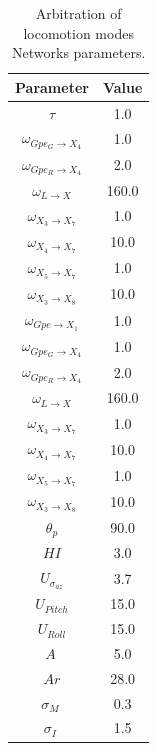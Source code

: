 \documentclass[preprint,12pt]{elsarticle}
\begin{document}
\begin{table}[t]
\centering
\caption{Arbitration of locomotion modes Networks parameters.}
\begin{tabular}{|c|c|}
\hline
\textbf{Parameter} & \textbf{Value} \\ \hline
$\tau$ & 1.0 \\ \hline

$\omega_{Gpe_G \rightarrow X_4}$ & 1.0 \\ \hline
$\omega_{Gpe_R \rightarrow X_4}$ & 2.0 \\ \hline

$\omega_{L \rightarrow X}$ & 160.0 \\ \hline

$\omega_{X_3 \rightarrow X_7}$ & 1.0 \\ \hline
$\omega_{X_4 \rightarrow X_7}$ & 10.0 \\ \hline
$\omega_{X_5 \rightarrow X_7}$ & 1.0 \\ \hline

$\omega_{X_3 \rightarrow X_8}$ & 10.0 \\ \hline
$\omega_{Gpe \rightarrow X_1}$ & 1.0 \\ \hline

$\omega_{Gpe_G \rightarrow X_4}$ & 1.0 \\ \hline
$\omega_{Gpe_R \rightarrow X_4}$ & 2.0 \\ \hline

$\omega_{L \rightarrow X}$ & 160.0 \\ \hline



$\omega_{X_3 \rightarrow X_7}$ & 1.0 \\ \hline
$\omega_{X_4 \rightarrow X_7}$ & 10.0 \\ \hline
$\omega_{X_5 \rightarrow X_7}$ & 1.0 \\ \hline

$\omega_{X_3 \rightarrow X_8}$ & 10.0 \\ \hline

$\theta_{p}$ & 90.0 \\ \hline

$HI$ & 3.0 \\ \hline

$U_{\sigma_{az}}$ & 3.7 \\ \hline
$U_{Pitch}$ & 15.0 \\ \hline
$U_{Roll}$ & 15.0 \\ \hline
$A\ $ & 5.0 \\ \hline
$ Ar $ & 28.0 \\ \hline
$\sigma_{M}\ $ & 0.3 \\ \hline
$\sigma_{I}\ $ & 1.5 \\ \hline
\end{tabular}
\label{table:Locom_NN}
\end{table}
\end{document}
